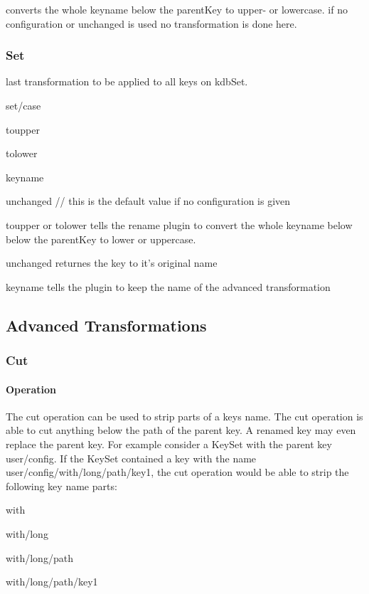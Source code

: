 converts the whole keyname below the parent\+Key to upper-\/ or lowercase. if no configuration or {\ttfamily unchanged} is used no transformation is done here.

\subsubsection*{Set}

last transformation to be applied to all keys on kdb\+Set.

{\ttfamily set/case}
\begin{DoxyItemize}
\item toupper
\item tolower
\item keyname
\item unchanged // this is the default value if no configuration is given
\end{DoxyItemize}

{\ttfamily toupper} or {\ttfamily tolower} tells the rename plugin to convert the whole keyname below below the parent\+Key to lower or uppercase.

{\ttfamily unchanged} returnes the key to it's original name

{\ttfamily keyname} tells the plugin to keep the name of the advanced transformation

\subsection*{Advanced Transformations}

\subsubsection*{Cut}

\paragraph*{Operation}

The cut operation can be used to strip parts of a keys name. The cut operation is able to cut anything below the path of the parent key. A renamed key may even replace the parent key. For example consider a Key\+Set with the parent key {\ttfamily user/config}. If the Key\+Set contained a key with the name {\ttfamily user/config/with/long/path/key1}, the cut operation would be able to strip the following key name parts\+:


\begin{DoxyItemize}
\item with
\item with/long
\item with/long/path
\item with/long/path/key1
\end{DoxyItemize}

